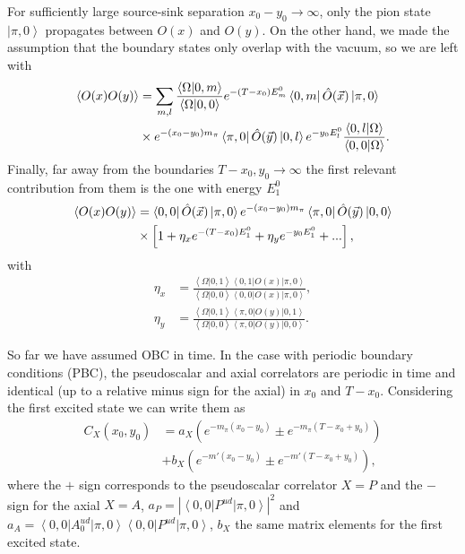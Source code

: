For sufficiently large source-sink separation $x_0-y_0\rightarrow\infty$, only the pion state $\left|\pi,0\right>$ propagates between $O(x)$ and $O(y)$. On the other hand, we made the assumption that the boundary states only overlap with the vacuum, so we are left with
\begin{align}
\left<O(x)O(y)\right>&=\sum_{m,l}\frac{\left<\Omega|0,m\right>}{\left<\Omega|0,0\right>}e^{-(T-x_0)E_m^{0}}\left<0,m\right|\hat{O}(\vec{x})\left|\pi,0\right> \notag \\
&\times e^{-(x_0-y_0)m_{\pi}}\left<\pi,0\right|\hat{O}(\vec{y})\left|0,l\right>e^{-y_0E_l^{0}}\frac{\left<0,l|\Omega\right>}{\left<0,0|\Omega\right>}.
\end{align}
Finally, far away from the boundaries $T-x_0,y_0\rightarrow\infty$ the first relevant contribution from them is the one with energy $E_1^0$
\begin{align}
\label{ch_foundation:eq:2pt_spec}
\left<O(x)O(y)\right>&=\left<0,0\right|\hat{O}(\vec{x})\left|\pi,0\right>e^{-(x_0-y_0)m_{\pi}}\left<\pi,0\right|\hat{O}(\vec{y})\left|0,0\right> \notag \\
&\times\left[1+\eta_xe^{-(T-x_0)E_1^0}+\eta_ye^{-y_0E_1^0}+...\right],
\end{align}
with 
\begin{align}
\eta_x&=\frac{\left<\Omega|0,1\right>\left<0,1\right|O(x)\left|\pi,0\right>}{\left<\Omega|0,0\right>\left<0,0\right|O(x)\left|\pi,0\right>}, \\
\eta_y&=\frac{\left<\Omega|0,1\right>\left<\pi,0\right|O(y)\left|0,1\right>}{\left<\Omega|0,0\right>\left<\pi,0\right|O(y)\left|0,0\right>}.
\end{align}

So far we have assumed OBC in time. In the case with periodic boundary conditions (PBC), the pseudoscalar and axial correlators are periodic in time and identical (up to a relative minus sign for the axial) in $x_0$ and $T-x_0$. Considering the first excited state we can write them as
\begin{align}
\label{ch_observables:eq:corrs_PBC}
C_X(x_0,y_0)&=a_X\left(e^{-m_{\pi}(x_0-y_0)}\pm e^{-m_{\pi}(T-x_0+y_0)}\right)\\
&+b_X\left(e^{-m'(x_0-y_0)}\pm e^{-m'(T-x_0+y_0)}\right),
\end{align}
where the $+$ sign corresponds to the pseudoscalar correlator $X=P$ and the $-$ sign for the axial $X=A$,  $a_P=|\left<0,0\right|P^{ud}\left|\pi,0\right>|^2$ and $a_A=\left<0,0\right|A_0^{ud}\left|\pi,0\right>\left<0,0\right|P^{ud}\left|\pi,0\right>$, $b_X$ the same matrix elements for the first excited state. 


